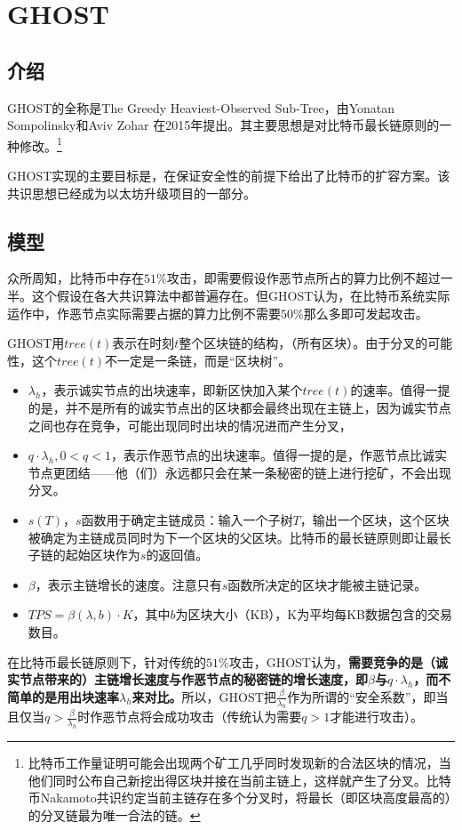 \section{GHOST}
\subsection{介绍}
GHOST的全称是The Greedy Heaviest-Observed Sub-Tree，由Yonatan Sompolinsky和Aviv Zohar 在2015年提出\cite{sompolinsky2015secure}。其主要思想是对比特币最长链原则的一种修改。\footnote{比特币工作量证明可能会出现两个矿工几乎同时发现新的合法区块的情况，当他们同时公布自己新挖出得区块并接在当前主链上，这样就产生了分叉。比特币Nakamoto共识约定当前主链存在多个分叉时，将最长（即区块高度最高的）的分叉链最为唯一合法的链。}	

GHOST实现的主要目标是，在保证安全性的前提下给出了比特币的扩容方案。该共识思想已经成为以太坊升级项目的一部分。

\subsection{模型}
众所周知，比特币中存在$51\%$攻击，即需要假设作恶节点所占的算力比例不超过一半。这个假设在各大共识算法中都普遍存在。但GHOST认为，在比特币系统实际运作中，作恶节点实际需要占据的算力比例不需要$50\%$那么多即可发起攻击。


GHOST用$tree(t)$表示在时刻$t$整个区块链的结构，（所有区块）。由于分叉的可能性，这个$tree(t)$不一定是一条链，而是“区块树”。
\begin{itemize}
	\item $\lambda_h$，表示诚实节点的出块速率，即新区快加入某个$tree(t)$的速率。值得一提的是，并不是所有的诚实节点出的区块都会最终出现在主链上，因为诚实节点之间也存在竞争，可能出现同时出块的情况进而产生分叉，
	\item $q\cdot\lambda_h,0<q<1$，表示作恶节点的出块速率。值得一提的是，作恶节点比诚实节点更团结——他（们）永远都只会在某一条秘密的链上进行挖矿，不会出现分叉。
	\item $s(T)$，$s$函数用于确定主链成员：输入一个子树$T$，输出一个区块，这个区块被确定为主链成员同时为下一个区块的父区块。比特币的最长链原则即让最长子链的起始区块作为$s$的返回值。
	\item $\beta$，表示主链增长的速度。注意只有$s$函数所决定的区块才能被主链记录。
	\item $TPS=\beta(\lambda,b)\cdot K$，其中$b$为区块大小（KB），K为平均每KB数据包含的交易数目。
\end{itemize}
在比特币最长链原则下，针对传统的$51\%$攻击，GHOST认为，\textbf{需要竞争的是（诚实节点带来的）主链增长速度与作恶节点的秘密链的增长速度，即$\beta$与$q\cdot\lambda_h$，而不简单的是用出块速率$\lambda_h$来对比。}所以，GHOST把$\frac{\beta}{\lambda_h}$作为所谓的“安全系数”，即当且仅当$q>\frac{\beta}{\lambda_h}$时作恶节点将会成功攻击（传统认为需要$q>1$才能进行攻击）。
	
